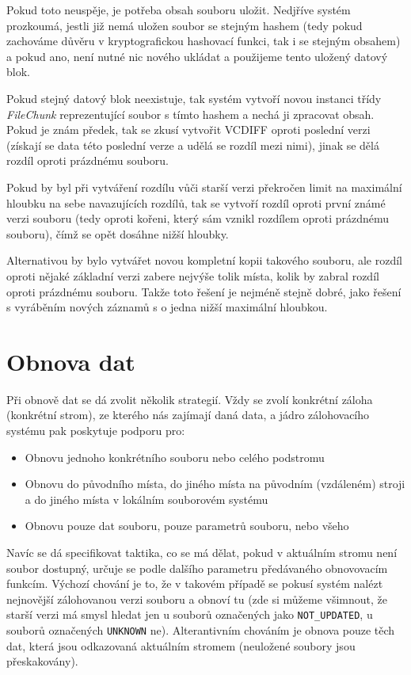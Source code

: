 Pokud toto neuspěje, je potřeba obsah souboru uložit. Nedjříve systém prozkoumá,
jestli již nemá uložen soubor se stejným hashem (tedy pokud zachováme důvěru
v kryptografickou hashovací funkci, tak i se stejným obsahem) a pokud ano, není
nutné nic nového ukládat a použijeme tento uložený datový blok.

Pokud stejný datový blok neexistuje, tak systém vytvoří novou instanci třídy
{\it FileChunk} reprezentující soubor s tímto hashem a nechá ji zpracovat obsah.
Pokud je znám předek, tak se zkusí vytvořit \gls{VCDIFF} oproti poslední verzi
(získají se data této poslední verze a udělá se rozdíl mezi nimi), jinak se dělá
rozdíl oproti prázdnému souboru.

Pokud by byl při vytváření rozdílu vůči starší verzi překročen limit na maximální
hloubku na sebe navazujících rozdílů, tak se vytvoří rozdíl oproti první známé
verzi souboru (tedy oproti kořeni, který sám vznikl rozdílem oproti prázdnému
souboru), čímž se opět dosáhne nižší hloubky.

Alternativou by bylo vytvářet novou kompletní kopii takového souboru, ale rozdíl
oproti nějaké základní verzi zabere nejvýše tolik místa, kolik by zabral rozdíl
oproti prázdnému souboru. Takže toto řešení je nejméně stejně dobré, jako řešení
s vyráběním nových záznamů s o jedna nižší maximální hloubkou.

\section{Obnova dat}

Při obnově dat se dá zvolit několik strategií. Vždy se zvolí konkrétní záloha
(konkrétní strom), ze kterého nás zajímají daná data, a jádro zálohovacího
systému pak poskytuje podporu pro:
\begin{itemize}
	\item Obnovu jednoho konkrétního souboru nebo celého podstromu
	\item Obnovu do původního místa, do jiného místa na původním (vzdáleném)
	stroji a do jiného místa v lokálním souborovém systému
	\item Obnovu pouze dat souboru, pouze parametrů souboru, nebo všeho
\end{itemize}

Navíc se dá specifikovat taktika, co se má dělat, pokud v aktuálním stromu není
soubor dostupný, určuje se podle dalšího parametru předávaného obnovovacím
funkcím. Výchozí chování je to, že v takovém případě se pokusí systém nalézt
nejnovější zálohovanou verzi souboru a obnoví tu (zde si můžeme všimnout, že
starší verzi má smysl hledat jen u souborů označených jako
\texttt{NOT\_UPDATED}, u souborů označených \texttt{UNKNOWN} ne). Alterantivním
chováním je obnova pouze těch dat, která jsou odkazovaná aktuálním stromem
(neuložené soubory jsou přeskakovány).

